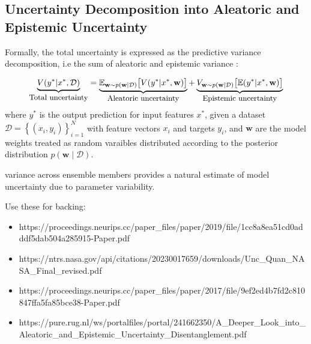  



\subsection{Uncertainty Decomposition into Aleatoric and Epistemic Uncertainty}
\label{sec:sep_aleatoric_and_epistemic}
Formally, the total uncertainty is expressed as the predictive variance decomposition, i.e the sum of aleatoric and epistemic variance \parencite{depeweg2018uncertainty_decomposition}:

\begin{equation}
    \begin{gathered} \underbrace{V(y^*|x^*,\mathcal{D})}_{\displaystyle\text{\small Total uncertainty}} =
    \underbrace{\mathbb{E}_{\mathbf{w}\sim p(\mathbf{w}|\mathcal{D})}\big[V(y^*| x^*,\mathbf{w})\big]}_{\displaystyle\text{\small Aleatoric uncertainty}}+
    \underbrace{V_{\mathbf{w}\sim p(\mathbf{w}|\mathcal{D})}\big[\mathbb{E}(y^*| x^*,\mathbf{w})\big]}_{\displaystyle\text{\small Epistemic uncertainty}}
    \end{gathered}
\end{equation}
where $y^*$ is the output prediction for input features $x^*$, given a dataset $\mathcal{D}=\left\{(x_i, y_i)\right\}_{i=1}^{N}$ with feature vectors $x_i$ and targets $y_i$, and $\mathbf{w}$ are the model weights treated as random varaibles distributed according to the posterior distribution $p(\mathbf{w} \mid \mathcal{D}).$

variance across ensemble members provides a natural estimate of model uncertainty due to parameter variability.

Use these for backing: 
\begin{itemize}
    \item https://proceedings.neurips.cc/paper_files/paper/2019/file/1cc8a8ea51cd0adddf5dab504a285915-Paper.pdf
    \item https://ntrs.nasa.gov/api/citations/20230017659/downloads/Unc_Quan_NASA_Final_revised.pdf
    \item https://proceedings.neurips.cc/paper_files/paper/2017/file/9ef2ed4b7fd2c810847ffa5fa85bce38-Paper.pdf
    \item https://pure.rug.nl/ws/portalfiles/portal/241662350/A_Deeper_Look_into_Aleatoric_and_Epistemic_Uncertainty_Disentanglement.pdf
\end{itemize}






